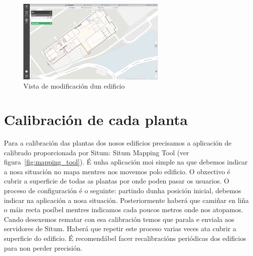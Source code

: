 \begin{figure}[tb] 
	\begin{center}
		\includegraphics[width=0.65\textwidth]{figures/Capturas/edificio}
		\caption{Vista de modificación dun edificio}
		\label{fig:edificio}
	\end{center}
\end{figure}

\section{Calibración de cada planta}
Para a calibración das plantas dos nosos edificios precisamos a aplicación de calibrado proporcionada por Situm: Situm Mapping Tool (ver figura~\ref{fig:mapping_tool}). É unha aplicación moi simple na que debemos indicar a nosa situación no mapa mentres nos movemos polo edificio. O obxectivo é cubrir a superficie de todas as plantas por onde poden pasar os usuarios.
O proceso de configuración é o seguinte: partindo dunha posición inicial, debemos indicar na aplicación a nosa situación. Posteriormente haberá que camiñar en liña o máis recta posíbel mentres indicamos cada poucos metros onde nos atopamos. Cando desexemos rematar con esa calibración temos que parala e enviala aos servidores de Situm. Haberá que repetir este proceso varias veces ata cubrir a superficie do edificio.
É recomendábel facer recalibracións periódicas dos edificios para non perder precisión.


